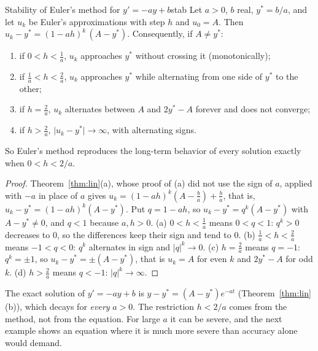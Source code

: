 \documentclass[11pt]{article}
\begin{document}
\begin{thm}{Stability of Euler's method for $y'=-ay+b$}{stab}
Let $a>0$, $b$ real, $y^*=b/a$, and let $u_k$ be Euler's approximations with step $h$ and $u_0=A$. Then $u_k-y^*=(1-ah)^k\,(A-y^*)$. Consequently, if $A\ne y^*$:
\begin{enumerate}[label=(\alph*),nosep]
  \item if $0<h<\frac1a$, $u_k$ approaches $y^*$ without crossing it (monotonically);
  \item if $\frac1a<h<\frac2a$, $u_k$ approaches $y^*$ while alternating from one side of $y^*$ to the other;
  \item if $h=\frac2a$, $u_k$ alternates between $A$ and $2y^*-A$ forever and does not converge;
  \item if $h>\frac2a$, $\lvert u_k-y^*\rvert\to\infty$, with alternating signs.
\end{enumerate}
So Euler's method reproduces the long-term behavior of every solution exactly when $0<h<2/a$.
\end{thm}
\begin{proof}
Theorem~\ref{thm:lin}(a), whose proof of (a) did not use the sign of $a$, applied with $-a$ in place of $a$ gives $u_k=(1-ah)^k\left(A-\frac ba\right)+\frac ba$, that is, $u_k-y^*=(1-ah)^k(A-y^*)$. Put $q=1-ah$, so $u_k-y^*=q^k(A-y^*)$ with $A-y^*\ne0$, and $q<1$ because $a,h>0$. (a) $0<h<\frac1a$ means $0<q<1$: $q^k>0$ decreases to $0$, so the differences keep their sign and tend to $0$. (b) $\frac1a<h<\frac2a$ means $-1<q<0$: $q^k$ alternates in sign and $\lvert q\rvert^k\to0$. (c) $h=\frac2a$ means $q=-1$: $q^k=\pm1$, so $u_k-y^*=\pm(A-y^*)$, that is $u_k=A$ for even $k$ and $2y^*-A$ for odd $k$. (d) $h>\frac2a$ means $q<-1$: $\lvert q\rvert^k\to\infty$.
\end{proof}

The exact solution of $y'=-ay+b$ is $y-y^*=(A-y^*)e^{-at}$ (Theorem~\ref{thm:lin}(b)), which decays for \emph{every} $a>0$. The restriction $h<2/a$ comes from the method, not from the equation. For large $a$ it can be severe, and the next example shows an equation where it is much more severe than accuracy alone would demand.
\end{document}
